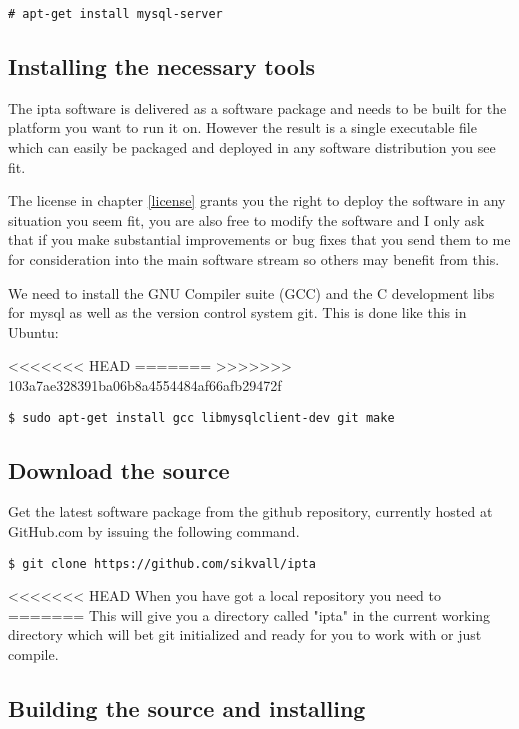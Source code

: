 \documentclass[english,twoside,openright,a4paper,12pt]{article}
\begin{document}
\begin{verbatim}
# apt-get install mysql-server
\end{verbatim}

\subsection{Installing the necessary tools}

The ipta software is delivered as a software package and needs to be built for the platform you want to run it on. However the result is a single executable file which can easily be packaged and deployed in any software distribution you see fit.

The license in chapter \ref{license} grants you the right to deploy the software in any situation you seem fit, you are also free to modify the software and I only ask that if you make substantial improvements or bug fixes that you send them to me for consideration into the main software stream so others may benefit from this.

We need to install the GNU Compiler suite (GCC) and the C development libs for mysql as well as the version control system git. This is done like this in Ubuntu:

<<<<<<< HEAD
\small
=======
>>>>>>> 103a7ae328391ba06b8a4554484af66afb29472f
\begin{verbatim}
$ sudo apt-get install gcc libmysqlclient-dev git make
\end{verbatim}
\normalsize

\subsection{Download the source}

Get the latest software package from the github repository, currently hosted at GitHub.com by issuing the following command.

\small
\begin{verbatim}
$ git clone https://github.com/sikvall/ipta
\end{verbatim}
\normalsize

<<<<<<< HEAD
When you have got a local repository you need to 
=======
This will give you a directory called "ipta" in the current working directory which will bet git initialized and ready for you to work with or just compile.

\subsection{Building the source and installing}
\end{document}
